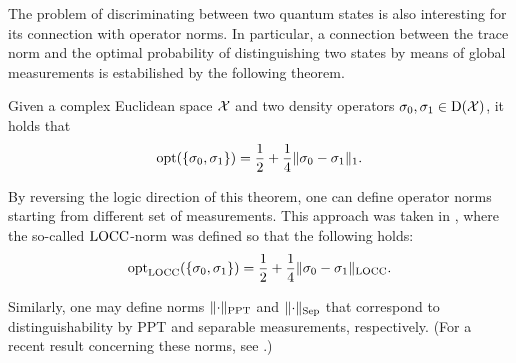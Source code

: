 The problem of discriminating between two quantum states is also 
interesting for its connection with operator norms. 
In particular, a connection between the trace norm and the 
optimal probability of distinguishing two states by means of global measurements 
is estabilished by the following theorem.
\begin{theorem}
Given a complex Euclidean space $\mathcal{X}$ and two density operators
$\sigma_{0}, \sigma_{1} \in \mathrm{D}(\mathcal{X})$, it holds that
  \begin{equation}
    \operatorname{opt}(\{\sigma_{0},\sigma_{1}\}) = 
      \frac{1}{2} + \frac{1}{4}\lVert\sigma_{0}-\sigma_{1}\rVert_{1}.
  \end{equation}
\end{theorem}
By reversing the logic direction of this theorem, one can define operator norms 
starting from different set of measurements.
This approach was taken in \cite{Matthews09}, where the so-called $\mathrm{LOCC}$-norm 
was defined so that the following holds:
\begin{equation}
  \operatorname{opt}_{\mathrm{LOCC}}(\{\sigma_{0},\sigma_{1}\}) = 
    \frac{1}{2} + \frac{1}{4}\lVert\sigma_{0}-\sigma_{1}\rVert_{\mathrm{LOCC}}.
\end{equation}

Similarly, one may define norms $\lVert\cdot\rVert_{\mathrm{PPT}}$ and $\lVert\cdot\rVert_{\mathrm{Sep}}$
that correspond to distinguishability by PPT and separable measurements,
respectively. (For a recent result concerning these norms, see \cite{Aubrun15}.) 

